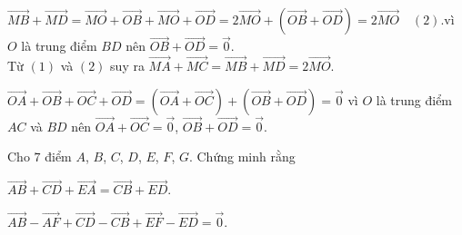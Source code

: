\begin{baitap}
{\begin{listEX}[1]
			$\overrightarrow{MB}+\overrightarrow{MD}=\overrightarrow{MO}+\overrightarrow{OB}+\overrightarrow{MO}+\overrightarrow{OD}=2\overrightarrow{MO}+\left(\overrightarrow{OB}+\overrightarrow{OD}\right) =2\overrightarrow{MO}\quad (2)$.vì $O$ là trung  điểm $BD$ nên $\overrightarrow{OB}+\overrightarrow{OD}=\overrightarrow{0}$.\\
			Từ $(1)$ và $(2)$ suy ra $\overrightarrow{MA}+\overrightarrow{MC}=\overrightarrow{MB}+\overrightarrow{MD}=2\overrightarrow{MO}$.
			\item $\overrightarrow{OA}+\overrightarrow{OB}+\overrightarrow{OC}+\overrightarrow{OD}=\left(\overrightarrow{OA}+\overrightarrow{OC}\right) +\left(\overrightarrow{OB}+\overrightarrow{OD}\right)=\overrightarrow{0}$ vì $O$ là trung  điểm $AC$ và $BD$ nên $\overrightarrow{OA}+\overrightarrow{OC}=\overrightarrow{0}$, $\overrightarrow{OB}+\overrightarrow{OD}=\overrightarrow{0}$.
		\end{listEX}
	}
\end{baitap} 

\begin{baitap}%
	Cho $7$ điểm $A$, $B$, $C$, $D$, $E$, $F$, $G$. Chứng minh rằng
	\begin{listEX}[2]
		\item $\overrightarrow{AB}+\overrightarrow{CD}+\overrightarrow{EA}=\overrightarrow{CB}+\overrightarrow{ED}$.
			\item $\overrightarrow{AB}-\overrightarrow{AF}+\overrightarrow{CD}-\overrightarrow{CB}+\overrightarrow{EF}-\overrightarrow{ED}=\overrightarrow{0}$.
	\end{listEX}
\end{baitap} 

